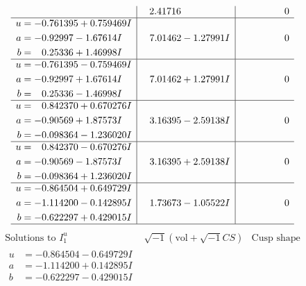 \documentclass[1p]{elsarticle_modified}
\theoremstyle{definition}
\newcommand{\I}{\sqrt{-1}}
\begin{document}
$$\begin{array}{c|c|c}
 & \phantom{-}2.41716\phantom{ +0.000000I} & \phantom{-0.000000 } 0 \\ \hline\begin{aligned}
u &= -0.761395 + 0.759469 I \\
a &= -0.92997 - 1.67614 I \\
b &= \phantom{-}0.25336 + 1.46998 I\end{aligned}
 & \phantom{-}7.01462 - 1.27991 I & \phantom{-0.000000 } 0 \\ \hline\begin{aligned}
u &= -0.761395 - 0.759469 I \\
a &= -0.92997 + 1.67614 I \\
b &= \phantom{-}0.25336 - 1.46998 I\end{aligned}
 & \phantom{-}7.01462 + 1.27991 I & \phantom{-0.000000 } 0 \\ \hline\begin{aligned}
u &= \phantom{-}0.842370 + 0.670276 I \\
a &= -0.90569 + 1.87573 I \\
b &= -0.098364 - 1.236020 I\end{aligned}
 & \phantom{-}3.16395 - 2.59138 I & \phantom{-0.000000 } 0 \\ \hline\begin{aligned}
u &= \phantom{-}0.842370 - 0.670276 I \\
a &= -0.90569 - 1.87573 I \\
b &= -0.098364 + 1.236020 I\end{aligned}
 & \phantom{-}3.16395 + 2.59138 I & \phantom{-0.000000 } 0 \\ \hline\begin{aligned}
u &= -0.864504 + 0.649729 I \\
a &= -1.114200 - 0.142895 I \\
b &= -0.622297 + 0.429015 I\end{aligned}
 & \phantom{-}1.73673 - 1.05522 I & \phantom{-0.000000 } 0\\
 \hline 
 \end{array}$$\newpage$$\begin{array}{c|c|c}  
\text{Solutions to }I^u_{1}& \I (\text{vol} + \sqrt{-1}CS) & \text{Cusp shape}\\
 \hline 
\begin{aligned}
u &= -0.864504 - 0.649729 I \\
a &= -1.114200 + 0.142895 I \\
b &= -0.622297 - 0.429015 I\end{aligned}

\end{array}$$
\end{document}
